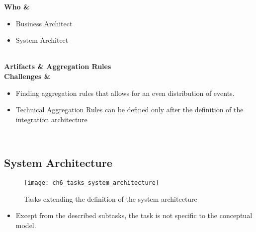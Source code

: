 \begin{minipage}{\textwidth}
\begin{tabular}
	\hline \bfseries Who & 
	\begin{itemize}
		\item Business Architect
		\item System Architect
	\end{itemize}
	\\
	\hline \bfseries Artifacts & Aggregation Rules\\
	\hline \bfseries Challenges & 
	\begin{itemize}
		\item Finding aggregation rules that allows for an even distribution of events.
		\item Technical Aggregation Rules can be defined only after the definition of the integration architecture
	\end{itemize}\\
	\hline 
\end{tabular}
\end{minipage}

\subsection{System Architecture }

\begin{figure}[htpb] \centering 
	\texttt{[image: ch6\_tasks\_system\_architecture]} 
	\caption{Tasks extending the definition of the system architecture} 
	\label{fig:ch6_tasks_system_architecture} 
\end{figure}

\begin{itemize}
	\item Except from the described subtasks, the task is not specific to the conceptual model.
\end{itemize}


